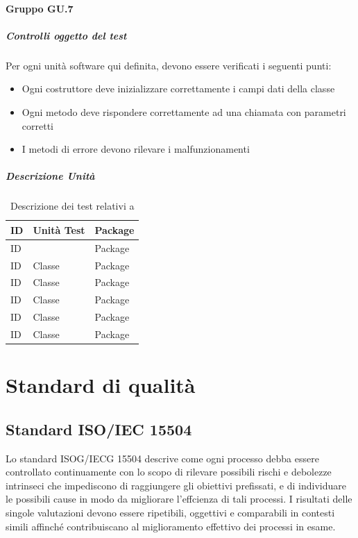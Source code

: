 \documentclass[12pt,a4paper]{article}
\begin{document}
\paragraph{Gruppo GU.7}
\subparagraph{Controlli oggetto del test}
Per ogni unità software qui definita, devono essere verificati i seguenti punti:
\begin{itemize}
	\item Ogni costruttore deve inizializzare correttamente i campi dati della classe
	\item Ogni metodo deve rispondere correttamente ad una chiamata con parametri corretti
	\item I metodi di errore devono rilevare i malfunzionamenti
\end{itemize}
\subparagraph{Descrizione Unità}
\begin{table}[H]
	\begin{center}
		\begin{tabular}{p{} p{} p{}}
			\toprule
			\textbf{ID}   & \textbf{Unità Test}	& \textbf{Package} \\ \midrule
			\midrule
			ID &  & Package\\ \midrule
			ID & Classe & Package\\ \midrule
			ID & Classe & Package\\ \midrule
			ID & Classe & Package\\ \midrule
			ID & Classe & Package\\ \midrule
			ID & Classe & Package\\ \midrule
			
			\bottomrule
		\end{tabular}
	\end{center}
	\caption{Descrizione dei test relativi a \TODO{}}
\end{table}
\newpage
\section{Standard di qualità}
\subsection{Standard ISO/IEC 15504}
Lo standard ISOG/IECG 15504 descrive come ogni processo debba essere controllato
continuamente con lo scopo di rilevare possibili rischi e debolezze intrinseci che impediscono
di raggiungere gli obiettivi prefissati, e di individuare le possibili cause in
modo da migliorare l'effcienza di tali processi. I risultati delle singole valutazioni devono
essere ripetibili, oggettivi e comparabili in contesti simili affinché contribuiscano
al miglioramento effettivo dei processi in esame.
\end{document}
